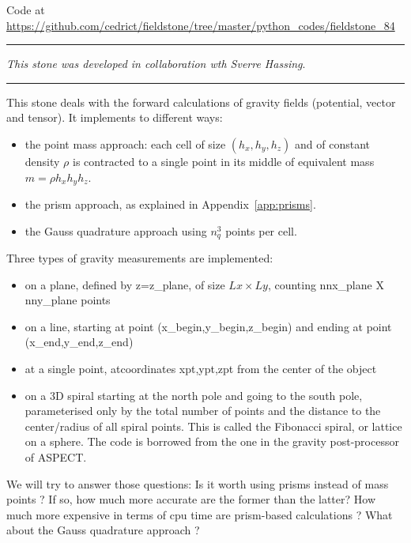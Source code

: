 

\begin{center}
Code at \url{https://github.com/cedrict/fieldstone/tree/master/python_codes/fieldstone_84}
\end{center}

\par\noindent\rule{\textwidth}{0.4pt}

{\sl This stone was developed in collaboration wth Sverre Hassing}. 

\par\noindent\rule{\textwidth}{0.4pt}

This stone deals with the forward calculations of gravity fields (potential, vector and tensor).
It implements to different ways: 
\begin{itemize}
\item the point mass approach: each cell of size $(h_x,h_y,h_z)$ and of constant density $\rho$
is contracted to a single point in its middle of equivalent mass $m=\rho h_xh_yh_z$.
\item the prism approach, as explained in Appendix~\ref{app:prisms}.
\item the Gauss quadrature approach using $n_q^3$ points per cell.
\end{itemize}

Three types of gravity measurements are implemented:
\begin{itemize}
\item on a plane, defined by z=z\_{plane}, of size $Lx \times Ly$, counting nnx\_plane X nny\_plane points
\item on a line, starting at point (x\_begin,y\_begin,z\_begin) and ending at point (x\_end,y\_end,z\_end)
\item at a single point, atcoordinates xpt,ypt,zpt from the center of the object
\item on a 3D spiral starting at the north pole and going to the south pole, parameterised only 
by the total number of points and the distance to the center/radius of all spiral points.
This is called the Fibonacci spiral, or lattice on a sphere. The code is borrowed from the 
one in the gravity post-processor of ASPECT.
\end{itemize}

We will try to answer those questions:
Is it worth using prisms instead of mass points ?  
If so, how much more accurate are the former than the latter?
How much more expensive in terms of cpu time are prism-based calculations ?
What about the Gauss quadrature approach ? 

